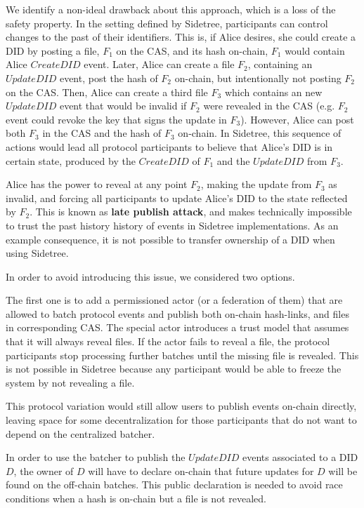 \documentclass[10pt,a4paper]{article}
\begin{document}
We identify a non-ideal drawback about this approach, which is a loss of the safety property. In the setting defined by Sidetree, participants can 
control changes to the past of their identifiers. This is, if Alice desires, she could create a DID by posting a file, $F_{1}$ on the CAS, and its 
hash on-chain, $F_{1}$ would contain Alice $CreateDID$ event. Later, Alice can create a file $F_{2}$, containing an $UpdateDID$ event, post the hash 
of $F_{2}$ on-chain, but intentionally not posting $F_{2}$ on the CAS. Then, Alice can create a third file $F_{3}$ which contains an new $UpdateDID$
event that would be invalid if $F_{2}$ were revealed in the CAS (e.g. $F_{2}$ event could revoke the key that signs the update in $F_{3}$). However, 
Alice can post both $F_{3}$ in the CAS and the hash of $F_{3}$ on-chain. In Sidetree, this sequence of actions would lead all protocol participants 
to believe that Alice's DID is in certain state, produced by the $CreateDID$ of $F_{1}$ and the $UpdateDID$ from $F_{3}$.

Alice has the power to reveal at any point $F_{2}$, making the update from $F_{3}$ as invalid, and forcing all participants to update Alice's
DID to the state reflected by $F_{2}$. This is known as \textbf{late publish attack}, and makes technically impossible to trust the past history 
history of events in Sidetree implementations. As an example consequence, it is not possible to transfer ownership of a DID when using Sidetree.

In order to avoid introducing this issue, we considered two options. 

The first one is to add a permissioned actor (or a federation of them) that are allowed to batch protocol events and publish both on-chain hash-links,
and files in corresponding CAS. The special actor introduces a trust model that assumes that it will always reveal files. If the actor fails to 
reveal a file, the protocol participants stop processing further batches until the missing file is revealed. This is not possible in Sidetree because
any participant would be able to freeze the system by not revealing a file. 

This protocol variation would still allow users to publish events on-chain directly, leaving space for some decentralization for those participants that do not want to depend on the centralized batcher. 

In order to use the batcher to publish the $UpdateDID$ events associated to a DID $D$, the owner of $D$ will have to declare on-chain that future 
updates for $D$ will be found on the off-chain batches. This public declaration is needed to avoid race conditions when a hash is on-chain but
a file is not revealed.
\end{document}
